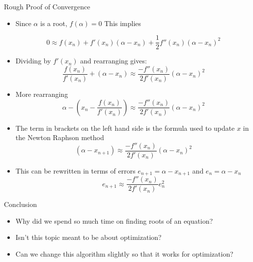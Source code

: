 \documentclass[10pt]{beamer}
\begin{document}
\begin{frame}{Rough Proof of Convergence}
  \begin{itemize}
  \item Since $\alpha$ is a root, $f(\alpha)=0$ This implies

    \begin{equation}
      0\approx f(x_n)+f'(x_n)(\alpha-x_n)+\frac{1}{2}f''(x_n)(\alpha-x_n)^2
    \end{equation}

  \item Dividing by $f'(x_n)$ and rearranging gives:
    \begin{equation}
      \frac{f(x_n)}{f'(x_n)}+(\alpha-x_n)\approx\frac{-f''(x_n)}{2f'(x_n)}(\alpha-x_n)^2
    \end{equation}
  \end{itemize}
\end{frame}
\begin{frame}
  \begin{itemize}
  \item More rearranging
    \begin{equation}
      \alpha-\left(x_n-\frac{f(x_n)}{f'(x_n)}\right)\approx\frac{-f''(x_n)}{2f'(x_n)}(\alpha-x_n)^2
    \end{equation}

  \item The term in brackets on the left hand side is the formula used to update $x$ in the Newton Raphson method
    \begin{equation}
      (\alpha-x_{n+1})\approx\frac{-f''(x_n)}{2f'(x_n)}(\alpha-x_n)^2
    \end{equation}

  \item This can be rewritten in terms of errors $e_{n+1}=\alpha-x_{n+1}$ and $e_n=\alpha-x_n$
    \begin{equation}
      e_{n+1}\approx\frac{-f''(x_n)}{2f'(x_n)}e_n^2
    \end{equation}
  \end{itemize}
\end{frame}
\begin{frame}{Conclusion}
  \begin{itemize}
  \item Why did we spend so much time on finding roots of an equation?

  \item Isn't this topic meant to be about optimization?

  \item Can we change this algorithm slightly so that it works for optimization?
  \end{itemize}
\end{frame}
\end{document}
